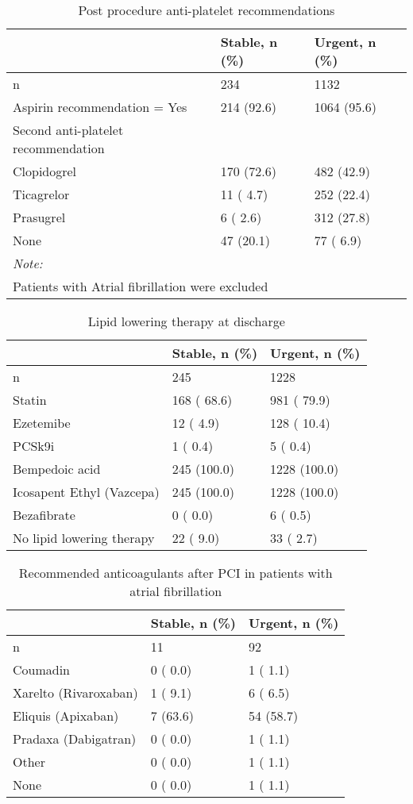\documentclass[
]{article}
\begin{document}
\begin{longtable}[t]{lll}
\caption{\label{tab:table 43}Post procedure anti-platelet recommendations}\\
\toprule
 & Stable, n (\%) & Urgent, n (\%)\\
\midrule
n & 234 & 1132\\
Aspirin recommendation = Yes & 214 (92.6) & 1064 (95.6)\\
Second anti-platelet recommendation &  & \\
\hspace{1em}Clopidogrel & 170 (72.6) & 482 (42.9)\\
\hspace{1em}Ticagrelor & 11 ( 4.7) & 252 (22.4)\\
\addlinespace
\hspace{1em}Prasugrel & 6 ( 2.6) & 312 (27.8)\\
\hspace{1em}None & 47 (20.1) & 77 ( 6.9)\\
\bottomrule
\multicolumn{3}{l}{\rule{0pt}{1em}\textit{Note: }}\\
\multicolumn{3}{l}{\rule{0pt}{1em}Patients with Atrial fibrillation were excluded}\\
\end{longtable}

\begin{longtable}[t]{lll}
\caption{\label{tab:table 44}Lipid lowering therapy at discharge}\\
\toprule
 & Stable, n (\%) & Urgent, n (\%)\\
\midrule
n & 245 & 1228\\
Statin & 168 ( 68.6) & 981 ( 79.9)\\
Ezetemibe & 12 (  4.9) & 128 ( 10.4)\\
PCSk9i & 1 (  0.4) & 5 (  0.4)\\
Bempedoic acid & 245 (100.0) & 1228 (100.0)\\
\addlinespace
Icosapent Ethyl (Vazcepa) & 245 (100.0) & 1228 (100.0)\\
Bezafibrate & 0 (  0.0) & 6 (  0.5)\\
No lipid lowering therapy & 22 (  9.0) & 33 (  2.7)\\
\bottomrule
\end{longtable}

\begin{longtable}[t]{lll}
\caption{\label{tab:table 45}Recommended anticoagulants  after PCI in patients with atrial fibrillation}\\
\toprule
 & Stable, n (\%) & Urgent, n (\%)\\
\midrule
n & 11 & 92\\
Coumadin & 0 ( 0.0) & 1 ( 1.1)\\
Xarelto (Rivaroxaban) & 1 ( 9.1) & 6 ( 6.5)\\
Eliquis (Apixaban) & 7 (63.6) & 54 (58.7)\\
Pradaxa (Dabigatran) & 0 ( 0.0) & 1 ( 1.1)\\
\addlinespace
Other & 0 ( 0.0) & 1 ( 1.1)\\
None & 0 ( 0.0) & 1 ( 1.1)\\
\bottomrule
\end{longtable}
\end{document}

